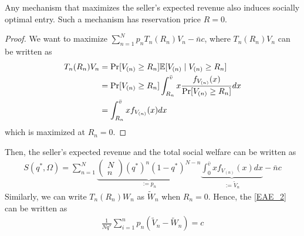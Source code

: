 \documentclass[11pt]{elegantbook}
\begin{document}
\begin{proposition}
    Any mechanism that maximizes the seller's expected revenue also induces socially optimal entry. Such a mechanism has reservation price $R=0$.
\end{proposition}
\begin{proof}
    We want to maximize $\sum_{n=1}^N p_n T_n(R_n)V_n-\bar{n}c$, where $T_n(R_n)V_n$ can be written as
    \begin{equation}
        \begin{aligned}
            T_n(R_n)V_n&=\textnormal{Pr}[V_{(n)}\geq R_n]\mathbb{E}[V_{(n)}\mid V_{(n)}\geq R_n]\\
            &=\textnormal{Pr}[V_{(n)}\geq R_n]
            \int_{R_n}^{\bar{v}}x \frac{f_{V_{(n)}}(x)}{\textnormal{Pr}[V_{(n)}\geq R_n]}dx\\
            &=
            \int_{R_n}^{\bar{v}}x f_{V_{(n)}}(x) dx
        \end{aligned}
        \nonumber
    \end{equation}
    which is maximized at $R_n=0$.
\end{proof}
Then, the seller's expected revenue and the total social welfare can be written as
\begin{equation}
    \begin{aligned}
        S(q^*,\Omega)=\sum_{n=1}^N \underbrace{\begin{pmatrix}N\\n\end{pmatrix}(q^*)^{n}(1-q^*)^{N-n}}_{:=p_n} \underbrace{\int_{0}^{\bar{v}}x f_{V_{(n)}}(x) dx}_{:=\tilde{V}_n}-\bar{n}c
    \end{aligned}
    \nonumber
\end{equation}
Similarly, we can write $T_n(R_n)W_n$ as $\tilde{W}_n$ when $R_n=0$. Hence, the \eqref{EAE_2} can be written as
\begin{equation}
    \begin{aligned}
        \frac{1}{Nq^*}\sum_{i=1}^n p_n \left(\tilde{V}_n-\tilde{W}_n\right)=c
    \end{aligned}
    \label{EAE_3}
\end{equation}
\end{document}
